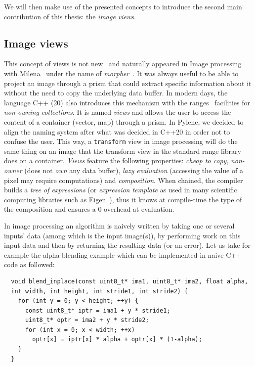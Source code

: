 We will then make use of the presented concepts to introduce the second main contribution of this thesis: the
\emph{image views}.


\subsection*{Image views}


This concept of views is not new~\parencite{novak.1997.reuse} and naturally appeared in Image processing with
Milena~\parencite{geraud.2012.ipolmeeting,levillain.2010.icip} under the name of
\emph{morpher}~\parencite{levillain.2009.ismm,geraud.2012.hdr}. It was always useful to be able to project an image
through a prism that could extract specific information about it without the need to copy the underlying data buffer. In
modern days, the language C++ (20) also introduces this mechanism with the ranges~\parencite{niebler.2014.ranges}
facilities for \emph{non-owning collections}. It is named \emph{views} and allows the user to access the content of a
container (vector, map) through a prism. In Pylene, we decided to align the naming system after what was decided in
C++20 in order not to confuse the user. This way, a \texttt{transform} view in image processing will do the same thing
on an image that the transform view in the standard range library does on a container. \emph{Views} feature the
following properties: \emph{cheap to copy}, \emph{non-owner} (does not \emph{own} any data buffer), \emph{lazy
  evaluation} (accessing the value of a pixel may require computations) and \emph{composition}. When chained, the compiler
builds a \emph{tree of expressions} (or \emph{expression template} as used in many scientific computing libraries such
as Eigen~\parencite{guennebaud.2010.eigen}), thus it knows at compile-time the type of the composition and ensures a
0-overhead at evaluation.

In image processing an algorithm is naively written by taking one or several inputs' data (among which is the input
image(s)),  by performing work on this input data and then by returning the resulting data (or an error). Let us take
for example the alpha-blending example which can be implemented in naive C++ code as followed:
\begin{verbatim}
  void blend_inplace(const uint8_t* ima1, uint8_t* ima2, float alpha,
  int width, int height, int stride1, int stride2) {
    for (int y = 0; y < height; ++y) {
      const uint8_t* iptr = ima1 + y * stride1;
      uint8_t* optr = ima2 + y * stride2;
      for (int x = 0; x < width; ++x)
        optr[x] = iptr[x] * alpha + optr[x] * (1-alpha);
    }
  }
\end{verbatim}

